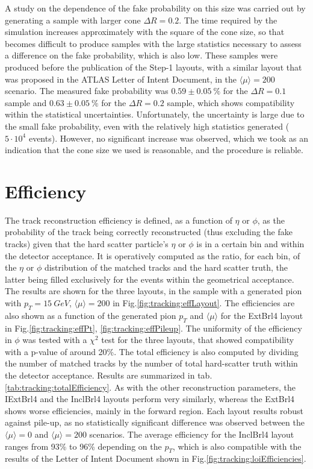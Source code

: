 \documentclass[a4paper,twoside,12pt]{book}
\begin{document}
A study on the dependence of the fake probability on this size was carried out by generating a sample with larger cone $\Delta R = 0.2$.
The time required by the simulation increases approximately with the square of the cone size, so that becomes difficult to produce samples with the large statistics necessary to assess
a difference on the fake probability, which is also low. These samples were produced before the publication of the Step-1 layouts, with a similar layout that was proposed in the
ATLAS Letter of Intent Document\cite{loi}, in the $\langle\mu\rangle = 200$ scenario. The measured fake probability was $0.59 \pm 0.05\ \%$ for the $\Delta R = 0.1$ sample and $0.63 \pm 0.05\ \%$ for
the $\Delta R = 0.2$ sample,
which shows compatibility within the statistical uncertainties. Unfortunately, the uncertainty is large due to the small fake probability, even with the relatively high statistics generated ($5\cdot 10^{4}$
events). However, no significant increase was observed, which we took as an indication that the cone size we used is reasonable, and the procedure is reliable.

\section{Efficiency}
The track reconstruction efficiency is defined, as a function of $\eta$ or $\phi$, as the probability of the track being correctly reconstructed (thus excluding the fake tracks) given that
the hard scatter particle's $\eta$ or $\phi$ is in a certain bin and within the detector acceptance. It is operatively computed as the ratio, for each bin, of the $\eta$ or $\phi$ distribution
of the matched tracks and the hard scatter truth, the latter being filled exclusively for the events within the geometrical acceptance. The results are shown for the three layouts, in the
sample with a generated pion with $p_{T} = 15\ GeV$, $\langle\mu\rangle = 200$ in Fig.\ref{fig:tracking:effLayout}. The efficiencies are also shown as a function of the generated pion $p_{T}$ and $\langle\mu\rangle$ for the ExtBrl4 layout in Fig.\ref{fig:tracking:effPt}, \ref{fig:tracking:effPileup}. The uniformity of the efficiency in $\phi$ was tested with a $\chi^{2}$ test for the three layouts, that 
showed compatibility with a p-value of around 20\%. The total efficiency is also computed by dividing the number of matched tracks by the number of total hard-scatter truth within
the detector acceptance. Results are summarized in tab.\ref{tab:tracking:totalEfficiency}. As with the other reconstruction parameters, the IExtBrl4 and the InclBrl4 layouts perform
very similarly, whereas the ExtBrl4 shows worse efficiencies, mainly in the forward region.
Each layout results robust against pile-up, as no statistically significant difference was observed between the $\langle\mu\rangle = 0$ and $\langle\mu\rangle = 200$ scenarios. The average efficiency
for the InclBrl4 layout ranges from 93\% to 96\% depending on the $p_{T}$, which is also
compatible with the results of the Letter of Intent Document\cite{loi} shown in Fig.\ref{fig:tracking:loiEfficiencies}.
\end{document}

